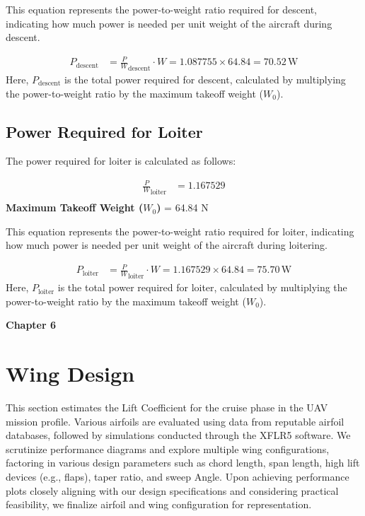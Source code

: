 \documentclass[12 pt]{article}
\begin{document}
This equation represents the power-to-weight ratio required for descent, indicating how much power is needed per unit weight of the aircraft during descent.

\begin{align*}
P_{\text{descent}} &= \frac{P}{W}_{\text{descent}} \cdot W = 1.087755 \times 64.84 = 70.52 \, \text{W} \tag{3.29}
\end{align*}
Here, $P_{\text{descent}}$ is the total power required for descent, calculated by multiplying the power-to-weight ratio by the maximum takeoff weight ($W_0$).

\subsection{{Power Required for Loiter}}

The power required for loiter is calculated as follows:

\begin{align*}
\frac{P}{W}_{\text{loiter}} &= 1.167529 \tag{3.30} \\
\end{align*}
\textbf{Maximum Takeoff Weight ($W_0$)} = 64.84 N

This equation represents the power-to-weight ratio required for loiter, indicating how much power is needed per unit weight of the aircraft during loitering.

\begin{align*}
P_{\text{loiter}} &= \frac{P}{W}_{\text{loiter}} \cdot W = 1.167529 \times 64.84 = 75.70 \, \text{W} \tag{3.31}
\end{align*}
Here, $P_{\text{loiter}}$ is the total power required for loiter, calculated by multiplying the power-to-weight ratio by the maximum takeoff weight ($W_0$).

\afterpage{\clearpage}
\newpage

\textbf{\Huge{Chapter 6}}
\section{Wing Design}
This section estimates the Lift Coefficient for the cruise phase in the UAV mission profile. Various airfoils are evaluated using data from reputable airfoil databases, followed by simulations conducted through the XFLR5 software. We scrutinize performance diagrams and explore multiple wing configurations, factoring in various design parameters such as chord length, span length, high lift devices (e.g., flaps), taper ratio, and sweep Angle. Upon achieving performance plots closely aligning with our design specifications and considering practical feasibility, we finalize airfoil and wing configuration for representation.
\vspace{5mm} 
 
\end{document}
